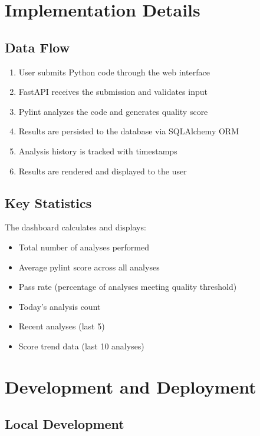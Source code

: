 \documentclass[12pt]{article}
\begin{document}
\section{Implementation Details}

\subsection{Data Flow}

\begin{enumerate}
    \item User submits Python code through the web interface
    \item FastAPI receives the submission and validates input
    \item Pylint analyzes the code and generates quality score
    \item Results are persisted to the database via SQLAlchemy ORM
    \item Analysis history is tracked with timestamps
    \item Results are rendered and displayed to the user
\end{enumerate}

\subsection{Key Statistics}

The dashboard calculates and displays:
\begin{itemize}
    \item Total number of analyses performed
    \item Average pylint score across all analyses
    \item Pass rate (percentage of analyses meeting quality threshold)
    \item Today's analysis count
    \item Recent analyses (last 5)
    \item Score trend data (last 10 analyses)
\end{itemize}

\section{Development and Deployment}

\subsection{Local Development}
\end{document}
